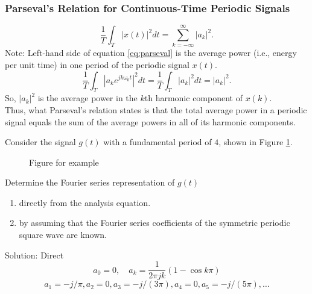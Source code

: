 \begin{frame}\frametitle{Parseval's Relation for Continuous-Time Periodic Signals}
    \begin{equation}\label{eq:parseval}
        \frac{1}{T}\int_{T} |x(t)|^2dt = \sum_{k=-\infty}^{\infty}|a_k|^2.
    \end{equation}
    \pause
    {
        \noindent Note: Left-hand side of equation \ref{eq:parseval} is the average power (i.e., energy per unit time) in one period of the periodic signal $x(t)$.\\

        \begin{equation}
            \frac{1}{T}\int_{T} \left| a_k e^{jk\omega_0 t}\right|^2dt = \frac{1}{T}\int_{T} \left| a_k \right|^2dt = |a_k|^2.
        \end{equation}
        So, $|a_k|^2$ is the average power in the $k$th harmonic component of $x(k)$.\\
        Thus, what Parseval's relation states is that the total average power in a periodic signal equals the sum of the average powers in all of its harmonic components.
    }
\end{frame}

\begin{frame}
    \begin{example}%
        Consider the signal $g(t)$ with a fundamental period of $4$, shown in Figure \ref{fi:example3p6}.
        \begin{figure}
          \centering
          
          \caption{Figure for example}\label{fi:example3p6}
        \end{figure}

        Determine the Fourier series representation of $g(t)$
        \begin{enumerate}
            \item directly from the analysis equation.
            \item by assuming that the Fourier series coefficients of the symmetric periodic square wave are known.
        \end{enumerate}
    \end{example}
\end{frame}



\begin{frame}{Solution: Direct}
{
    \begin{equation*}
        a_0 = 0, \quad a_k = \frac{1}{2\pi jk}\left(1-\cos k\pi\right)
    \end{equation*}
    \begin{equation*}
        a_1 = -j/\pi, a_2 = 0, a_3 = -j/(3\pi), a_4 = 0, a_5 = -j/(5\pi), \dots
    \end{equation*}
}
\end{frame}



